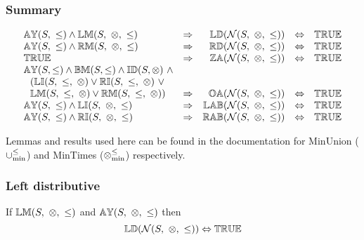 \documentclass[../Summary.tex]{subfiles}
\begin{document}
\subsubsection{Summary}

\[
\begin{array}{lcrcl} 
\propname{AY}(S,\ \leq) \wedge \propname{LM}(S,\ \otimes,\ \leq)
	& \Rightarrow
	& \propname{LD}(\mathcal{N}(S,\ \otimes,\ \leq)) 
    & \Leftrightarrow 
    & \propname{TRUE}
    \\ 
\propname{AY}(S,\ \leq) \wedge \propname{RM}(S,\ \otimes,\ \leq)
	& \Rightarrow
	& \propname{RD}(\mathcal{N}(S,\ \otimes,\ \leq)) 
    & \Leftrightarrow 
    & \propname{TRUE}
    \\ 
\propname{TRUE}
	& \Rightarrow
	& \propname{ZA}(\mathcal{N}(S,\ \otimes,\ \leq)) 
    & \Leftrightarrow 
    & \propname{TRUE}
    \\ 
\propname{AY}(S,\leq) \wedge \propname{BM}(S,\leq) \wedge \propname{ID}(S,\otimes) \ \wedge \\
\ \ (\propname{LI}(S,\ \leq,\ \otimes) \vee \propname{RI}(S,\ \leq,\ \otimes) \ \vee \\
\ \ \propname{LM}(S,\ \leq,\ \otimes) \vee \propname{RM}(S,\ \leq,\ \otimes))
	& \Rightarrow 
	& \propname{OA}(\mathcal{N}(S,\ \otimes,\ \leq)) 
    & \Leftrightarrow 
    & \propname{TRUE}
    \\ 
\propname{AY}(S,\ \leq) \wedge \propname{LI}(S,\ \otimes,\ \leq) 
	& \Rightarrow 
	& \propname{LAB}(\mathcal{N}(S,\ \otimes,\ \leq)) 
    & \Leftrightarrow 
    & \propname{TRUE}
    \\ 
\propname{AY}(S,\ \leq) \wedge \propname{RI}(S,\ \otimes,\ \leq) 
	& \Rightarrow 
	& \propname{RAB}(\mathcal{N}(S,\ \otimes,\ \leq)) 
    & \Leftrightarrow 
    & \propname{TRUE}
    \\
\end{array} 
\] 

Lemmas and results used here can be found in the documentation for MinUnion ($\mathbin{\cup_{\min}^{\leq}}$) and MinTimes ($\mathbin{\otimes_{\min}^{\leq}}$) respectively.




\subsubsection{Left distributive}

\begin{theorem} \label{thm:N_ld}
If ${\mathbb{LM}}(S,\ \otimes,\ \leq)$ and ${\mathbb{AY}}(S,\ \otimes, \ \leq)$ then
\begin{equation*}
\propname{LD}(\mathcal{N}(S,\ \otimes,\ \leq))  \Leftrightarrow \propname{TRUE}
\end{equation*}
\end{theorem}
\end{document}
